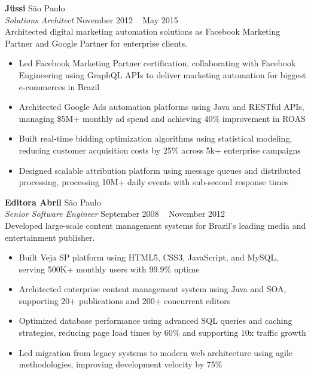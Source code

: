 \documentclass[a4paper]{article}
\begin{document}
\textbf{Jüssi}                                 \hfill São Paulo              \\
\textit{Solutions Architect} \hfill November 2012 ~ May 2015                 \\
\vspace{0.5mm}
Architected digital marketing automation solutions as Facebook Marketing Partner and Google Partner for enterprise clients.
\vspace{-2mm}
\begin{itemize}
\setlength\itemsep{-1mm}
\item Led Facebook Marketing Partner certification, collaborating with Facebook Engineering using GraphQL APIs to deliver marketing automation for biggest e-commerces in Brazil
\item Architected Google Ads automation platforms using Java and RESTful APIs, managing \$5M+ monthly ad spend and achieving 40\% improvement in ROAS
\item Built real-time bidding optimization algorithms using statistical modeling, reducing customer acquisition costs by 25\% across 5k+ enterprise campaigns
\item Designed scalable attribution platform using message queues and distributed processing, processing 10M+ daily events with sub-second response times
\end{itemize}

\textbf{Editora Abril}                        \hfill São Paulo              \\
\textit{Senior Software Engineer} \hfill September 2008 ~ November 2012     \\
\vspace{0.5mm}
Developed large-scale content management systems for Brazil's leading media and entertainment publisher.
\vspace{-2mm}
\begin{itemize}
\setlength\itemsep{-1mm}
\item Built Veja SP platform using HTML5, CSS3, JavaScript, and MySQL, serving 500K+ monthly users with 99.9\% uptime
\item Architected enterprise content management system using Java and SOA, supporting 20+ publications and 200+ concurrent editors
\item Optimized database performance using advanced SQL queries and caching strategies, reducing page load times by 60\% and supporting 10x traffic growth
\item Led migration from legacy systems to modern web architecture using agile methodologies, improving development velocity by 75\%
\end{itemize}
\end{document}
